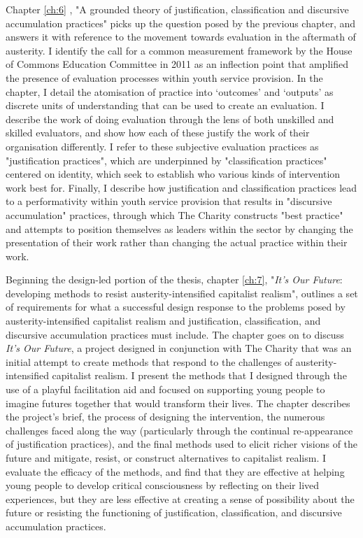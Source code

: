 Chapter \ref{ch:6} , "A grounded theory of justification, classification and discursive accumulation practices"  picks up the question posed by the previous chapter, and answers it with reference to the movement towards evaluation in the aftermath of austerity. I identify the call for a common measurement framework by the House of Commons Education Committee in 2011 as an inflection point that amplified the presence of evaluation processes within youth service provision. In the chapter, I detail the atomisation of practice into `outcomes' and `outputs' as discrete units of understanding that can be used to create an evaluation. I describe the work of doing evaluation through the lens of both unskilled and skilled evaluators, and show how each of these justify the work of their organisation differently. I refer to these subjective evaluation practices as "justification practices", which are underpinned by "classification practices" centered on identity, which seek to establish who various kinds of intervention work best for. Finally, I describe how justification and classification practices lead to a performativity within youth service provision that results in "discursive accumulation" practices, through which The Charity constructs "best practice" and attempts to position themselves as leaders within the sector by changing the presentation of their work rather than changing the actual practice within their work. 

Beginning the design-led portion of the thesis, chapter \ref{ch:7}, "\textit{It's Our Future}: developing methods to resist austerity-intensified capitalist realism", outlines a set of requirements for what a successful design response to the problems posed by austerity-intensified capitalist realism and justification, classification, and discursive accumulation practices must include. The chapter goes on to discuss \textit{It's Our Future}, a project designed in conjunction with The Charity that was an initial attempt to create methods that respond to the challenges of austerity-intensified capitalist realism. I present the methods that I designed through the use of a playful facilitation aid and focused on supporting young people to imagine futures together that would transform their lives. The chapter describes the project's brief, the process of designing the intervention, the numerous challenges faced along the way (particularly through the continual re-appearance of justification practices), and the final methods used to elicit richer visions of the future and mitigate, resist, or construct alternatives to capitalist realism. I evaluate the efficacy of the methods, and find that they are effective at helping young people to develop critical consciousness by reflecting on their lived experiences, but they are less effective at creating a sense of possibility about the future or resisting the functioning of justification, classification, and discursive accumulation practices.

